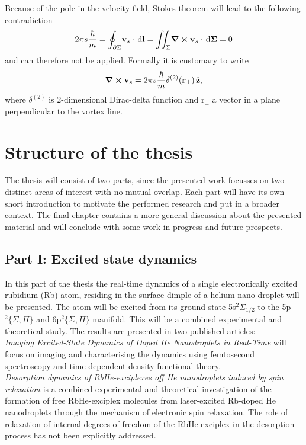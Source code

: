 \documentclass[11pt,a4paper,twoside]{article}
\renewcommand{\vec}[1]{\bm{\mathrm{#1}}}
\newcommand{\unit}[1]{\,\mathrm{#1}}
\begin{document}
			Because of the pole in the velocity field, Stokes theorem will lead to the following contradiction
			\begin{align}
				2\pi s\frac{\hbar}{m}=\oint_{\partial\Sigma}\!\vec{v}_s\cdot\unit{d}\vec{l} = \iint_{\Sigma}\!\curl{\vec{v}_s}\cdot\unit{d}\vec{\Sigma} = 0
			\end{align}
			and can therefore not be applied. Formally it is customary to write
			\begin{align}
				\curl{\vec{v}_s} = 2\pi s\frac{\hbar}{m}\delta^{(2)}(\vec{r}_\perp)\,\vu{z},
			\end{align}
			where $\delta^{(2)}$ is 2-dimensional Dirac-delta function and $\vec{r}_\perp$ a vector in a plane perpendicular to the vortex line.\\

	\newpage
	\section{Structure of the thesis}
		The thesis will consist of two parts, since the presented work focusses on two distinct areas of interest with no mutual overlap. Each part will have its own short introduction to motivate the performed research and put in a broader context. The final chapter contains a more general discussion about the presented material and will conclude with some work in progress and future prospects.

		\subsection{Part I: Excited state dynamics}
			In this part of the thesis the real-time dynamics of a single electronically excited rubidium (Rb) atom, residing in the surface dimple of a helium nano-droplet will be presented. The atom will be excited from its ground state 5s$^2\Sigma_{1/2}$ to the 5p$^2\{\Sigma,\Pi\}$ and 6p$^2\{\Sigma,\Pi\}$ manifold. This will be a combined experimental and theoretical study. The results are presented in two published articles:\\
		
			\emph{Imaging Excited-State Dynamics of Doped He Nanodroplets in Real-Time} will focus on imaging and characterising the dynamics using femtosecond spectroscopy and  time-dependent density functional theory.\\
		
			\emph{Desorption dynamics of RbHe-exciplexes off He nanodroplets induced by spin relaxation} is a combined experimental and theoretical investigation of the formation of free RbHe-exciplex molecules from laser-excited Rb-doped He nanodroplets through the mechanism of electronic spin relaxation. The role of relaxation of internal degrees of freedom of the RbHe exciplex in the desorption process has not been explicitly addressed.
\end{document}
